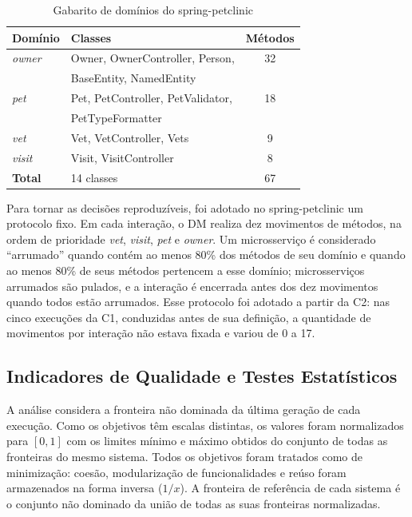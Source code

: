 \documentclass[conference]{IEEEtran}
\begin{document}
\begin{table}[htbp]
\caption{Gabarito de domínios do spring-petclinic}
\label{tab:gabarito}
\centering
\footnotesize
\begin{tabular}{llc}
\hline
\textbf{Domínio} & \textbf{Classes} & \textbf{Métodos} \\
\hline
\textit{owner} & Owner, OwnerController, Person, & 32 \\
               & BaseEntity, NamedEntity & \\
\textit{pet}   & Pet, PetController, PetValidator, & 18 \\
               & PetTypeFormatter & \\
\textit{vet}   & Vet, VetController, Vets & 9 \\
\textit{visit} & Visit, VisitController & 8 \\
\hline
\textbf{Total} & 14 classes & 67 \\
\hline
\end{tabular}
\end{table}

Para tornar as decisões reproduzíveis, foi adotado no spring-petclinic um protocolo fixo. Em cada interação, o DM realiza dez movimentos de métodos, na ordem de prioridade \textit{vet}, \textit{visit}, \textit{pet} e \textit{owner}. Um microsserviço é considerado ``arrumado'' quando contém ao menos 80\% dos métodos de seu domínio e quando ao menos 80\% de seus métodos pertencem a esse domínio; microsserviços arrumados são pulados, e a interação é encerrada antes dos dez movimentos quando todos estão arrumados. Esse protocolo foi adotado a partir da C2: nas cinco execuções da C1, conduzidas antes de sua definição, a quantidade de movimentos por interação não estava fixada e variou de 0 a 17.

\subsection{Indicadores de Qualidade e Testes Estatísticos}\label{sec:indicadores}

A análise considera a fronteira não dominada da última geração de cada execução. Como os objetivos têm escalas distintas, os valores foram normalizados para $[0,1]$ com os limites mínimo e máximo obtidos do conjunto de todas as fronteiras do mesmo sistema. Todos os objetivos foram tratados como de minimização: coesão, modularização de funcionalidades e reúso foram armazenados na forma inversa ($1/x$). A fronteira de referência de cada sistema é o conjunto não dominado da união de todas as suas fronteiras normalizadas.
\end{document}
